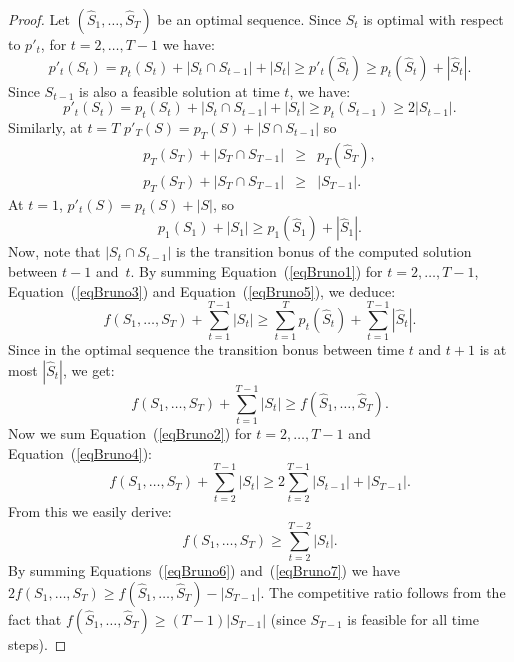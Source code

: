 \documentclass[a4paper]{book}
\newtheorem{proof}{\noindent{\bf Proof.} }
\begin{document}
\begin{proof}

 Let $(\hat{S}_1,\dots,\hat{S}_T)$ be an optimal sequence. Since $S_t$ is optimal with respect to $p'_t$, for $t=2,\dots,T-1$ we have:
 \begin{equation}\label{eqBruno1}
 p'_t(S_t)=p_t(S_t)+|S_t\cap S_{t-1}|+|S_t|\geq p'_t(\hat{S}_t)\geq p_t(\hat{S}_t)+|\hat{S}_t|.
 \end{equation}
Since $S_{t-1}$ is also a feasible solution at time $t$, we have:
 \begin{equation}\label{eqBruno2}
 p'_t(S_t)=p_t(S_t)+|S_t\cap S_{t-1}|+|S_t|\geq p_t(S_{t-1}) \geq 2|S_{t-1}|.
 \end{equation}
Similarly, at $t=T$  $p'_T(S)=p_T(S)+|S\cap S_{t-1}|$ so 
 \begin{eqnarray}
 p_T(S_T)+|S_T\cap S_{T-1}| & \geq & p_T(\hat{S}_T), \label{eqBruno3}\\
  p_T(S_T)+|S_T\cap S_{T-1}|&\geq& |S_{T-1}|. \label{eqBruno4}
 \end{eqnarray}
At $t=1$, $p'_t(S)=p_t(S)+|S|$, so 
 \begin{equation}\label{eqBruno5}
 p_1(S_1)+|S_1|\geq p_1(\hat{S}_1)+|\hat{S}_1|.
 \end{equation}
Now, note that $|S_t\cap S_{t-1}|$ is the transition bonus of the computed solution between $t-1$ and~$t$. By summing Equation~(\ref{eqBruno1}) for $t=2,\dots,T-1$, Equation~(\ref{eqBruno3}) and Equation~(\ref{eqBruno5}), we deduce:
\begin{equation}\nonumber
    f(S_1,\dots,S_T)+\sum_{t=1}^{T-1}|S_t| \geq \sum_{t=1}^T p_t(\hat{S}_t)+\sum_{t=1}^{T-1}|\hat{S}_t|.
\end{equation}
Since in the optimal sequence the transition bonus between time $t$ and $t+1$ is at most $|\hat{S}_t|$, we get:
\begin{equation}\label{eqBruno6}
    f(S_1,\dots,S_T)+\sum_{t=1}^{T-1}|S_t| \geq f(\hat{S}_1,\dots,\hat{S}_T).
\end{equation}
Now we sum Equation~(\ref{eqBruno2}) for $t=2,\dots,T-1$ and Equation~(\ref{eqBruno4}):
\begin{equation}\nonumber
    f(S_1,\dots,S_T)+\sum_{t=2}^{T-1}|S_t| \geq 2\sum_{t=2}^{T-1}|S_{t-1}|+|S_{T-1}|.
\end{equation}
From this we easily derive:
\begin{equation}\label{eqBruno7}
    f(S_1,\dots,S_T) \geq \sum_{t=2}^{T-2}|S_{t}|.
\end{equation}
By summing Equations~(\ref{eqBruno6}) and~(\ref{eqBruno7}) we have $2f(S_1,\dots,S_T)\geq f(\hat{S}_1,\dots,\hat{S}_T)-|S_{T-1}|$. The competitive ratio follows from the fact that $f(\hat{S}_1,\dots,\hat{S}_T)\geq (T-1)|S_{T-1}|$ (since $S_{T-1}$ is feasible for all time steps). %
\end{proof}
\end{document}
